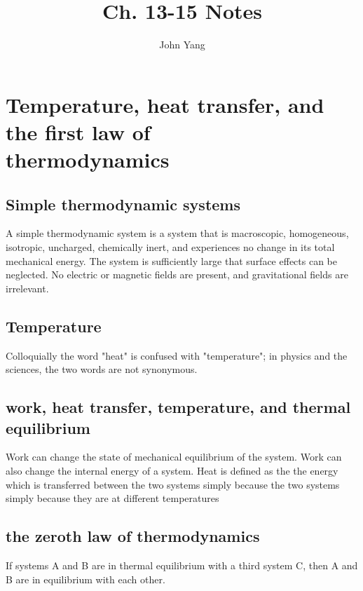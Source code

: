 \documentclass{article}
\title{Ch. 13-15 Notes}
\author{John Yang}
\begin{document}
\maketitle
\section{Temperature, heat transfer, and the first law of \\thermodynamics}
\subsection{Simple thermodynamic systems}
\begin{outline}
\1 A simple thermodynamic system is a system that is macroscopic, homogeneous, isotropic, uncharged, chemically inert, and experiences no change in its total mechanical energy. The system is sufficiently large that surface effects can be neglected. No electric or magnetic fields are present, and gravitational fields are irrelevant.
\end{outline}
\subsection{Temperature}
\begin{outline}
\1 Colloquially the word "heat" is confused with "temperature"; in physics and the sciences, the two words are not synonymous.
\end{outline}
\subsection{work, heat transfer, temperature, and thermal equilibrium}
\begin{outline}
\1 Work can change the state of mechanical equilibrium of the system. Work can also change the internal energy of a system. 
\1 Heat is defined as the the energy which is transferred between the two systems simply because the two systems simply because they are at different temperatures
\end{outline}
\subsection{the zeroth law of thermodynamics}
\begin{outline}
\1 If systems A and B are in thermal equilibrium with a third system C, then A and B are in equilibrium with each other.
\end{outline}
\end{document}
